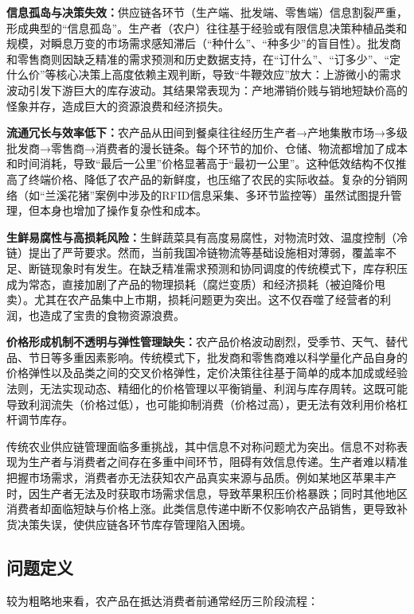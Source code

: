 \documentclass[lang=cn,12pt,a4paper]{elegantpaper}
\begin{document}
\textbf{信息孤岛与决策失效：}供应链各环节（生产端、批发端、零售端）信息割裂严重，形成典型的“信息孤岛”。生产者（农户）往往基于经验或有限信息决策种植品类和规模，对瞬息万变的市场需求感知滞后（“种什么”、“种多少”的盲目性）。批发商和零售商则因缺乏精准的需求预测和历史数据支持，在“订什么”、“订多少”、“定什么价”等核心决策上高度依赖主观判断，导致“牛鞭效应”放大：上游微小的需求波动引发下游巨大的库存波动。其结果常表现为：产地滞销价贱与销地短缺价高的怪象并存，造成巨大的资源浪费和经济损失。

\textbf{流通冗长与效率低下：}农产品从田间到餐桌往往经历生产者→产地集散市场→多级批发商→零售商→消费者的漫长链条。每个环节的加价、仓储、物流都增加了成本和时间消耗，导致“最后一公里”价格显著高于“最初一公里”。这种低效结构不仅推高了终端价格、降低了农产品的新鲜度，也压缩了农民的实际收益。复杂的分销网络（如“兰溪花猪”案例中涉及的RFID信息采集、多环节监控等）虽然试图提升管理，但本身也增加了操作复杂性和成本。

\textbf{生鲜易腐性与高损耗风险：}生鲜蔬菜具有高度易腐性，对物流时效、温度控制（冷链）提出了严苛要求。然而，当前我国冷链物流等基础设施相对薄弱，覆盖率不足、断链现象时有发生。在缺乏精准需求预测和协同调度的传统模式下，库存积压成为常态，直接加剧了产品的物理损耗（腐烂变质）和经济损耗（被迫降价甩卖）。尤其在农产品集中上市期，损耗问题更为突出。这不仅吞噬了经营者的利润，也造成了宝贵的食物资源浪费。

\textbf{价格形成机制不透明与弹性管理缺失：}农产品价格波动剧烈，受季节、天气、替代品、节日等多重因素影响。传统模式下，批发商和零售商难以科学量化产品自身的价格弹性以及品类之间的交叉价格弹性，定价决策往往基于简单的成本加成或经验法则，无法实现动态、精细化的价格管理以平衡销量、利润与库存周转。这既可能导致利润流失（价格过低），也可能抑制消费（价格过高），更无法有效利用价格杠杆调节库存。

传统农业供应链管理面临多重挑战，其中信息不对称问题尤为突出。信息不对称表现为生产者与消费者之间存在多重中间环节，阻碍有效信息传递。生产者难以精准把握市场需求，消费者亦无法获知农产品真实来源与品质。例如某地区苹果丰产时，因生产者无法及时获取市场需求信息，导致苹果积压价格暴跌；同时其他地区消费者却面临短缺与价格上涨。此类信息传递中断不仅影响农产品销售，更导致补货决策失误，使供应链各环节库存管理陷入困境。

\subsection{问题定义}
\label{subsec:problem_definition}
较为粗略地来看，农产品在抵达消费者前通常经历三阶段流程\citep{lee2007coordination,zhao2023optimizing}：
\end{document}
